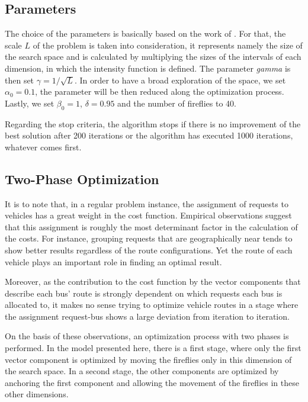 \documentclass[tuberlin,cic,tc,openright,english,noabntcite,oneside]{iiufrgs}
\begin{document}
\subsection{Parameters}
The choice of the parameters is basically based on the work of \textcite[p. 37-38]{yang_firefly_2013}. For that, the scale $L$ of the problem is taken into consideration, it represents namely the size of the search space and is calculated by multiplying the sizes of the intervals of each dimension, in which the intensity function is defined. The parameter \emph{gamma} is then set $\gamma = 1/\sqrt{L}$. In order to have a broad exploration of the space, we set $\alpha_0 = 0.1$, the parameter will be then reduced along the optimization process. Lastly, we set $\beta_0 = 1$, $\delta = 0.95$ and the number of fireflies to 40.

Regarding the stop criteria, the algorithm stops if there is no improvement of the best solution after 200 iterations or the algorithm has executed 1000 iterations, whatever comes first.

\subsection{Two-Phase Optimization}
It is to note that, in a regular problem instance, the assignment of requests to vehicles has a great weight in the cost function. Empirical observations suggest that this assignment is roughly the most determinant factor in the calculation of the costs. For instance, grouping requests that are geographically near tends to show better results regardless of the route configurations. Yet the route of each vehicle plays an important role in finding an optimal result.

Moreover, as the contribution to the cost function by the vector components that describe each bus' route is strongly dependent on which requests each bus is allocated to, it makes no sense trying to optimize vehicle routes in a stage where the assignment request-bus shows a large deviation from iteration to iteration.

On the basis of these observations, an optimization process with two phases is performed. In the model presented here, there is a first stage, where only the first vector component is optimized by moving the fireflies only in this dimension of the search space. In a second stage, the other components are optimized by anchoring the first component and allowing the movement of the fireflies in these other dimensions.
\end{document}
